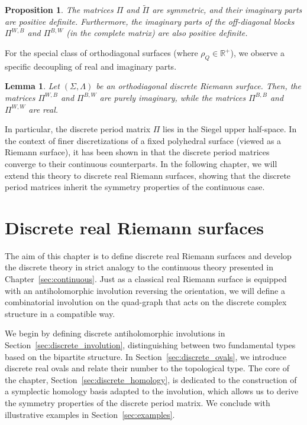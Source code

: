 \documentclass[11pt,a4paper]{article}
\newtheorem{proposition}[theorem]{Proposition}
\newtheorem{lemma}[theorem]{Lemma}
\theoremstyle{definition}
\begin{document}
\begin{proposition}\label{prop:period_matrix}
	The matrices $\Pi$ and $\tilde{\Pi}$ are symmetric, and their imaginary parts are positive definite. Furthermore, the imaginary parts of the off-diagonal blocks $\Pi^{W,B}$ and $\Pi^{B,W}$ (in the complete matrix) are also positive definite.
\end{proposition}

For the special class of orthodiagonal surfaces (where $\rho_Q \in \mathds{R}^+$), we observe a specific decoupling of real and imaginary parts.

\begin{lemma}\label{lem:period_orthodiagonal}
	Let $(\Sigma, \Lambda)$ be an orthodiagonal discrete Riemann surface. Then, the matrices $\Pi^{W,B}$ and $\Pi^{B,W}$ are purely imaginary, while the matrices $\Pi^{B,B}$ and $\Pi^{W,W}$ are real.
\end{lemma}

In particular, the discrete period matrix $\Pi$ lies in the Siegel upper half-space. In the context of finer discretizations of a fixed polyhedral surface (viewed as a Riemann surface), it has been shown in \cite{G23} that the discrete period matrices converge to their continuous counterparts.
In the following chapter, we will extend this theory to discrete real Riemann surfaces, showing that the discrete period matrices inherit the symmetry properties of the continuous case.


\section{Discrete real Riemann surfaces}\label{sec:discrete_real}

The aim of this chapter is to define discrete real Riemann surfaces and develop the discrete theory in strict analogy to the continuous theory presented in Chapter~\ref{sec:continuous}.
Just as a classical real Riemann surface is equipped with an antiholomorphic involution reversing the orientation, we will define a combinatorial involution on the quad-graph that acts on the discrete complex structure in a compatible way.

We begin by defining discrete antiholomorphic involutions in Section~\ref{sec:discrete_involution}, distinguishing between two fundamental types based on the bipartite structure. In Section~\ref{sec:discrete_ovals}, we introduce discrete real ovals and relate their number to the topological type. The core of the chapter, Section~\ref{sec:discrete_homology}, is dedicated to the construction of a symplectic homology basis adapted to the involution, which allows us to derive the symmetry properties of the discrete period matrix. We conclude with illustrative examples in Section~\ref{sec:examples}.
\end{document}
